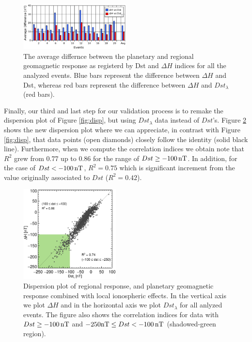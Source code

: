 \documentclass[a4paper,fleqn]{cas-dc}
\begin{document}
\begin{figure}
\centering
    \includegraphics[width=0.5\textwidth]{images/prom_dist.eps}
    \caption{The average differnce between the planetary and regional geomagnetic response as registerd by Dst and $\Delta H$ indices for all the analyzed events. Blue bars represent the difference between $\Delta H$ and Dst, whereas red bars represent the difference between $\Delta H$ and $Dst_\lambda$ (red bars).}
    \label{fig:valid}
\end{figure}


Finally, our third and last step for our validation process is to remake the dispersion plot of Figure \ref{fig:disp}, but using $Dst_\lambda$ data instead of $Dst$'s. Figure \ref{fig:valid_disp2} shows the new dispersion plot where we can appreciate, in contrast with Figure \ref{fig:disp}, that data points (open diamonds) closely follow the identity (solid black line). Furthermore, when we compute the correlation indices we obtain note that $R^2$ grew from 0.77 up to 0.86 for the range of $Dst \ge -100\, {\rm nT}$. In addition, for the case of $Dst < -100\, {\rm nT}$, $R^2=0.75$ which is significant increment from the value originally associated to $Dst$ ($R^2=0.42$).

      
\begin{figure}
    \centering
     \includegraphics[width=0.45\textwidth]{dispersion_general_dst_ld.eps}
      \caption{Dispersion plot of regional response, and planetary geomagnetic response combined with local ionospheric effects. In the vertical axis we plot $\Delta H$ and in the horizontal axis we plot $Dst_\lambda$ for all anlyzed events. The figure also shows the correlation indices for data with $Dst \ge -100\, {\rm nT}$ and $-250 {\rm nT}\le Dst < -100\, {\rm nT}$ (shadowed-green region).}
       \label{fig:valid_disp2}
\end{figure}
\end{document}
